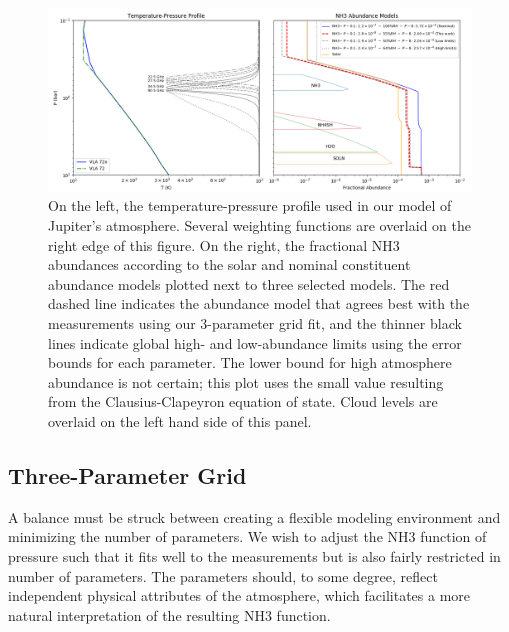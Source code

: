 \documentclass{article}
\begin{document}
	\begin{figure}
		\centering
		\includegraphics[width=\textwidth]{final_tp_const.png}
		\caption{\label{fig:tp}On the left, the temperature-pressure profile used in our model of Jupiter's atmosphere. Several weighting functions are overlaid on the right edge of this figure. On the right, the fractional NH3 abundances according to the solar and nominal constituent abundance models plotted next to three selected models. The red dashed line indicates the abundance model that agrees best with the measurements using our 3-parameter grid fit, and the thinner black lines indicate global high- and low-abundance limits using the error bounds for each parameter. The lower bound for high atmosphere abundance is not certain; this plot uses the small value resulting from the Clausius-Clapeyron equation of state. Cloud levels are overlaid on the left hand side of this panel.}
	\end{figure}


\subsection{Three-Parameter Grid}

	A balance must be struck between creating a flexible modeling environment and minimizing the number of parameters.
	We wish to adjust the NH3 function of pressure such that it fits well to the measurements but is also fairly restricted in number of parameters.
	The parameters should, to some degree, reflect independent physical attributes of the atmosphere, which facilitates a more natural interpretation of the resulting NH3 function.
\end{document}
